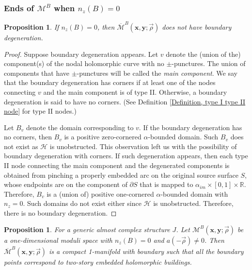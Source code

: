 \documentclass{amsart}
\newtheorem{prop}[thm]{Proposition}
\theoremstyle{definition}
\theoremstyle{remark}
\numberwithin{equation}{section}
\numberwithin{equation}{section} \makeatletter
\begin{document}
\subsubsection{Ends of $\mathcal{M}^B$ when $n_z(B)=0$}
\begin{prop}\label{Proposition, boundary degeneration do not occur when n_z=0}
If $n_z(B)=0$, then $\overline{\mathcal{M}}^B(\bm{x},\bm{y};\overrightarrow{\rho})$ does not have boundary degeneration. 
\end{prop}
\begin{proof}
Suppose boundary degeneration appears. Let $v$ denote the (union of the) component(s) of the nodal holomorphic curve with no $\pm$-punctures. The union of components that have $\pm$-punctures will be called the \textit{main component}. We say that the boundary degeneration has corners if at least one of the nodes connecting $v$ and the main component is of type II. Otherwise, a boundary degeneration is said to have no corners. (See Definition \ref{Definition, type I type II node} for type II nodes.)  

Let $B_v$ denote the domain corresponding to $v$. If the boundary degeneration has no corners, then $B_v$ is a positive zero-cornered $\alpha$-bounded domain. Such $B_v$ does not exist as $\mathcal{H}$ is unobstructed. This observation left us with the possibility of boundary degeneration with corners. If such degeneration appears, then each type II node connecting the main component and the degenerated components is obtained from pinching a properly embedded arc on the original source surface $S$, whose endpoints are on the component of $\partial S$ that is mapped to $\alpha_{im}\times[0,1]\times\mathbb{R}$. Therefore, $B_v$ is a (union of) positive one-cornered $\alpha$-bounded domain with $n_z=0$. Such domains do not exist either since $\mathcal{H}$ is unobstructed. Therefore, there is no boundary degeneration.
\end{proof}
\begin{prop}\label{Proposition, ends of 0-p curves, n_z=0}
For a generic almost complex structure $J$. Let $\mathcal{M}^B(\bm{x},\bm{y};\overrightarrow{\rho})$ be a one-dimensional moduli space with $n_z(B)=0$ and $a(-\overrightarrow{\rho})\neq 0$. Then $\overline{\mathcal{M}}^B(\bm{x},\bm{y};\overrightarrow{\rho})$ is a compact 1-manifold with boundary such that all the boundary points correspond to two-story embedded holomorphic buildings. 
\end{prop}
\end{document}
